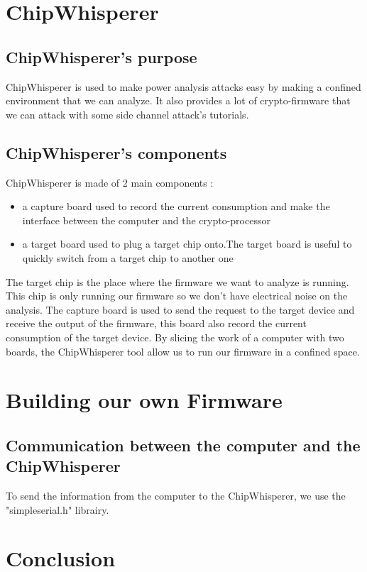\documentclass[a4paper,12pt]{article}
\begin{document}
\newpage

\tableofcontents
\newpage


\section{ChipWhisperer}
\subsection{ChipWhisperer's purpose}
ChipWhisperer is used to make power analysis attacks easy by making a confined environment that we can analyze. It also provides a lot of crypto-firmware that we can attack with some side channel attack's tutorials.
\subsection{ChipWhisperer's components }

\noindent ChipWhisperer is made of 2 main components :
\begin{itemize}
\item{a capture board used to record the current consumption and make the interface between the computer and the crypto-processor}
\item{a target board used to plug a target chip onto.The target board is useful to quickly switch from a target chip to another one} 
\end{itemize}

The target chip is the place where the firmware we want to analyze is running. This chip is only running our firmware so we don't have electrical noise on the analysis. The capture board is used to send the request to the target device and receive the output of the firmware, this board also record the current consumption of the target device. By slicing the work of a computer with two boards, the ChipWhisperer tool allow us to run our firmware in a confined space.

\section{Building our own Firmware}
\subsection{Communication between the computer and the ChipWhisperer}
To send the information from the computer to the ChipWhisperer, we use the "simpleserial.h" librairy.


\section{Conclusion}
\end{document}

